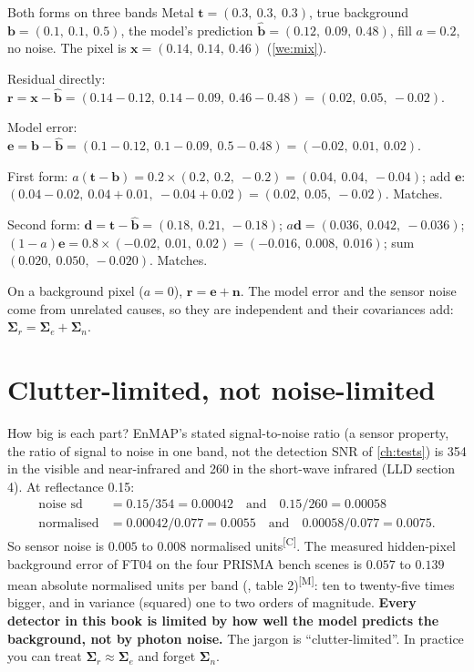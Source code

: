 \documentclass[11pt,a4paper,oneside,openany]{book}
\newcommand{\B}[1]{{\symbf{#1}}}
\newcommand{\B}[1]{{\bm{#1}}}
\newcommand{\meas}{\textsuperscript{\textsf{\scriptsize[M]}}}
\newcommand{\comp}{\textsuperscript{\textsf{\scriptsize[C]}}}
\newcommand{\vx}{\B{x}}
\newcommand{\vt}{\B{t}}
\newcommand{\vb}{\B{b}}
\newcommand{\vbh}{\hat{\B{b}}}
\newcommand{\vr}{\B{r}}
\newcommand{\ve}{\B{e}}
\newcommand{\vn}{\B{n}}
\newcommand{\vd}{\B{d}}
\newcommand{\mSig}{\B{\Sigma}}
\begin{document}
\begin{worked}[label=we:resid]{Both forms on three bands}
Metal $\vt=(0.3,\ 0.3,\ 0.3)$, true background $\vb=(0.1,\ 0.1,\ 0.5)$, the model's prediction $\vbh=(0.12,\ 0.09,\ 0.48)$, fill
$a=0.2$, no noise. The pixel is $\vx=(0.14,\ 0.14,\ 0.46)$ (\cref{we:mix}).

Residual directly: $\vr=\vx-\vbh=(0.14-0.12,\ 0.14-0.09,\ 0.46-0.48)=(0.02,\ 0.05,\ -0.02)$.

Model error: $\ve=\vb-\vbh=(0.1-0.12,\ 0.1-0.09,\ 0.5-0.48)=(-0.02,\ 0.01,\ 0.02)$.

First form: $a(\vt-\vb)=0.2\times(0.2,\ 0.2,\ -0.2)=(0.04,\ 0.04,\ -0.04)$; add $\ve$:
$(0.04-0.02,\ 0.04+0.01,\ -0.04+0.02)=(0.02,\ 0.05,\ -0.02)$. Matches.

Second form: $\vd=\vt-\vbh=(0.18,\ 0.21,\ -0.18)$; $a\vd=(0.036,\ 0.042,\ -0.036)$; $(1-a)\ve=0.8\times(-0.02,\ 0.01,\ 0.02)
=(-0.016,\ 0.008,\ 0.016)$; sum $(0.020,\ 0.050,\ -0.020)$. Matches.
\end{worked}

On a background pixel ($a=0$), $\vr=\ve+\vn$. The model error and the sensor noise come from unrelated causes, so they are
independent and their covariances add: $\mSig_r=\mSig_e+\mSig_n$.

\section{Clutter-limited, not noise-limited}

How big is each part? EnMAP's stated signal-to-noise ratio (a sensor property, the ratio of signal to noise in one band, not the
detection SNR of \cref{ch:tests}) is 354 in the visible and near-infrared and 260 in the short-wave infrared (LLD section 4). At
reflectance 0.15:
\begin{align*}
\text{noise sd} &= 0.15/354=0.00042 \quad\text{and}\quad 0.15/260=0.00058\\
\text{normalised} &= 0.00042/0.077=0.0055 \quad\text{and}\quad 0.00058/0.077=0.0075 .
\end{align*}
So sensor noise is $0.005$ to $0.008$ normalised units\comp. The measured hidden-pixel background error of FT04 on the four PRISMA bench
scenes is $0.057$ to $0.139$ mean absolute normalised units per band
(, table 2)\meas: ten to twenty-five times bigger, and in variance (squared) one
to two orders of magnitude. \textbf{Every detector in this book is limited by how well the model predicts the background, not by photon
noise.} The jargon is ``clutter-limited''. In practice you can treat $\mSig_r\approx\mSig_e$ and forget $\mSig_n$.
\end{document}
